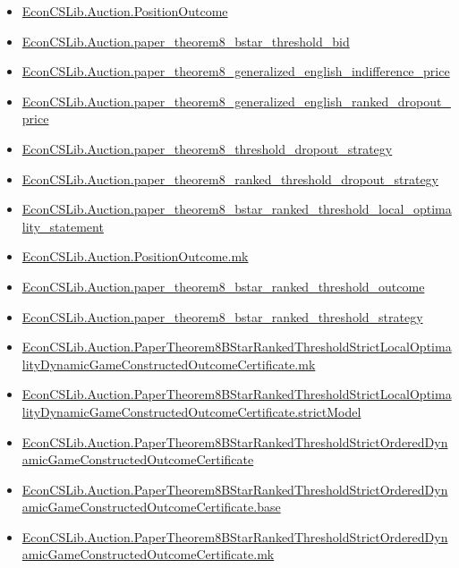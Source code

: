 \documentclass[10pt]{article}
\begin{document}
\begin{itemize}[leftmargin=1.2em]
\begin{itemize}[leftmargin=1.2em]
\item \hyperlink{library-prerequisite-110d00817d69dd50}{EconCSLib.Auction.PositionOutcome}
\item \hyperlink{library-prerequisite-e5927cada369fa28}{EconCSLib.Auction.paper\_theorem8\_bstar\_threshold\_bid}
\item \hyperlink{library-prerequisite-7b05b574eda88e5a}{EconCSLib.Auction.paper\_theorem8\_generalized\_english\_indifference\_price}
\item \hyperlink{library-prerequisite-4b6c9b40d598baa4}{EconCSLib.Auction.paper\_theorem8\_generalized\_english\_ranked\_dropout\_price}
\item \hyperlink{library-prerequisite-605b9a355ff10b78}{EconCSLib.Auction.paper\_theorem8\_threshold\_dropout\_strategy}
\item \hyperlink{library-prerequisite-0dc4a73e842cc398}{EconCSLib.Auction.paper\_theorem8\_ranked\_threshold\_dropout\_strategy}
\item \hyperlink{library-prerequisite-2d3eaab6e11b9a33}{EconCSLib.Auction.paper\_theorem8\_bstar\_ranked\_threshold\_local\_optimality\_statement}
\item \hyperlink{library-prerequisite-b7a973d8073bf3a3}{EconCSLib.Auction.PositionOutcome.mk}
\item \hyperlink{library-prerequisite-1907e72c61e21c64}{EconCSLib.Auction.paper\_theorem8\_bstar\_ranked\_threshold\_outcome}
\item \hyperlink{library-prerequisite-df7d2c6b114e7ca3}{EconCSLib.Auction.paper\_theorem8\_bstar\_ranked\_threshold\_strategy}
\item \hyperlink{library-prerequisite-3c35343188413b94}{EconCSLib.Auction.PaperTheorem8BStarRankedThresholdStrictLocalOptimalityDynamicGameConstructedOutcomeCertificate.mk}
\item \hyperlink{library-prerequisite-c3a1bd07309d2444}{EconCSLib.Auction.PaperTheorem8BStarRankedThresholdStrictLocalOptimalityDynamicGameConstructedOutcomeCertificate.strictModel}
\item \hyperlink{library-prerequisite-33bb0323909be500}{EconCSLib.Auction.PaperTheorem8BStarRankedThresholdStrictOrderedDynamicGameConstructedOutcomeCertificate}
\item \hyperlink{library-prerequisite-aca28da8ce22514c}{EconCSLib.Auction.PaperTheorem8BStarRankedThresholdStrictOrderedDynamicGameConstructedOutcomeCertificate.base}
\item \hyperlink{library-prerequisite-624480126a37ba39}{EconCSLib.Auction.PaperTheorem8BStarRankedThresholdStrictOrderedDynamicGameConstructedOutcomeCertificate.mk}

\end{itemize}
\end{itemize}
\end{document}
